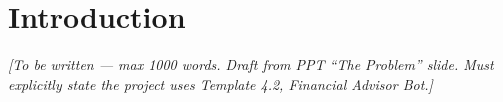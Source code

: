 \chapter{Introduction}
\label{ch:intro}

\textit{[To be written — max 1000 words. Draft from PPT ``The Problem'' slide.
Must explicitly state the project uses Template 4.2, Financial Advisor Bot.]}

